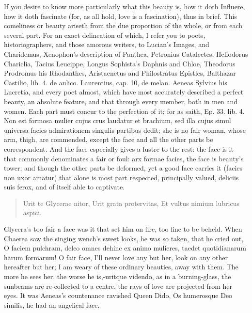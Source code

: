 If you desire to know more particularly what this beauty is, how it
doth Influere, how it doth fascinate (for, as all hold, love is a
fascination), thus in brief. This comeliness or beauty ariseth
from the due proportion of the whole, or from each several part. For an
exact delineation of which, I refer you to poets, historiographers, and
those amorous writers, to Lucian's Images, and Charidemus, Xenophon's
description of Panthea, Petronius Catalectes, Heliodorus Chariclia,
Tacius Leucippe, Longus Sophista's Daphnis and Chloe, Theodorus
Prodromus his Rhodanthes, Aristaenetus and Philostratus Epistles,
Balthazar Castilio, lib. 4. de aulico. Laurentius, cap. 10, de melan.
Aeneas Sylvius his Lucretia, and every poet almost, which have most
accurately described a perfect beauty, an absolute feature, and that
through every member, both in men and women. Each part must concur to
the perfection of it; for as \Seneca{} saith, Ep. 33. lib. 4. Non est
formosa mulier cujus crus laudatur et brachium, sed illa cujus simul
universa facies admirationem singulis partibus dedit; she is no fair
woman, whose arm, thigh, \etc{} are commended, except the face and all the
other parts be correspondent. And the face especially gives a lustre to
the rest: the face is it that commonly denominates a fair or foul: arx
formae facies, the face is beauty's tower; and though the other parts
be deformed, yet a good face carries it (facies non uxor amatur) that
alone is most part respected, principally valued, deliciis suis ferox,
and of itself able to captivate.

\begin{latin}
\begin{verse}%
Urit te Glycerae nitor,
Urit grata protervitas,
Et vultus nimium lubricus aspici.
\end{verse}%
\end{latin}

Glycera's too fair a face was it that set him on fire, too fine to be
beheld. When Chaerea saw the singing wench's sweet looks, he was
so taken, that he cried out, O faciem pulchram, deleo omnes dehinc ex
animo mulieres, taedet quotidianarum harum formarum! O fair face, I'll
never love any but her, look on any other hereafter but her; I am weary
of these ordinary beauties, away with them. The more he sees her, the
worse he is,-uritque videndo, as in a burning-glass, the sunbeams are
re-collected to a centre, the rays of love are projected from her eyes.
It was Aeneas's countenance ravished Queen Dido, Os humerosque Deo
similis, he had an angelical face.

